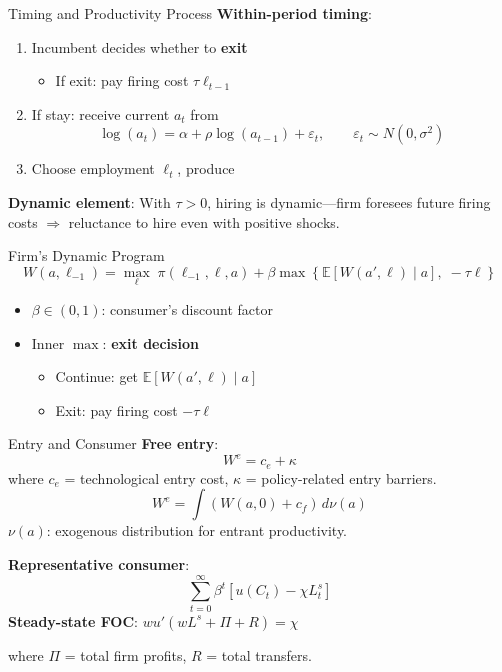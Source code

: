 \documentclass[blue]{beamer}
\newcommand{\E}{\mathbb{E}}
\begin{document}
\begin{frame}{Timing and Productivity Process}
	\textbf{Within-period timing}:
	\begin{enumerate}
		\item Incumbent decides whether to \textbf{exit}
		\begin{itemize}
			\item If exit: pay firing cost $\tau \ell_{t-1}$
		\end{itemize}
		\item If stay: receive current $a_t$ from
		\[
		\log(a_t) = \alpha + \rho \log(a_{t-1}) + \varepsilon_t, \qquad \varepsilon_t \sim N(0, \sigma^2)
		\]
		\item Choose employment $\ell_t$, produce
	\end{enumerate}
	
	\bigskip
	\textbf{Dynamic element}: With $\tau > 0$, hiring is dynamic---firm foresees future firing costs $\Rightarrow$ reluctance to hire even with positive shocks.
\end{frame}

\begin{frame}{Firm's Dynamic Program}
	\[
	W(a, \ell_{-1}) = \max_{\ell} \; \pi(\ell_{-1}, \ell, a) + \beta \max\left\{ \E[W(a', \ell) \mid a], \; -\tau \ell \right\}
	\]
	
	\begin{itemize}
		\item $\beta \in (0,1)$: consumer's discount factor
		\item Inner $\max$: \textbf{exit decision}
		\begin{itemize}
			\item Continue: get $\E[W(a', \ell) \mid a]$
			\item Exit: pay firing cost $-\tau \ell$
		\end{itemize}
	\end{itemize}
\end{frame}

\begin{frame}{Entry and Consumer}
	\textbf{Free entry}:
	\[
	W^e = c_e + \kappa
	\]
	where $c_e$ = technological entry cost, $\kappa$ = policy-related entry barriers.
	\[
	W^e = \int (W(a, 0) + c_f) \, d\nu(a)
	\]
	$\nu(a)$: exogenous distribution for entrant productivity.
	
	\bigskip
	\textbf{Representative consumer}:
	\[
	\sum_{t=0}^\infty \beta^t [u(C_t) - \chi L_t^s]
	\]
	\textbf{Steady-state FOC}: $w u'(wL^s + \Pi + R) = \chi$
	
	\medskip
	where $\Pi$ = total firm profits, $R$ = total transfers.
\end{frame}
\end{document}
